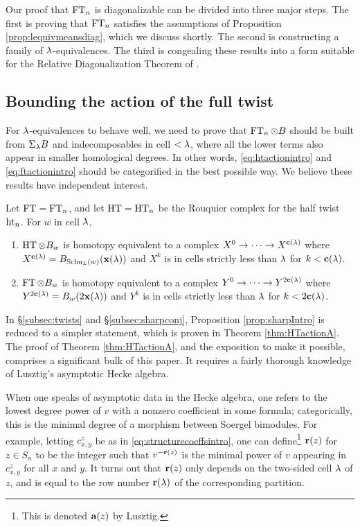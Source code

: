 Our proof that $\operatorname{FT}_n$ is diagonalizable can be divided into three major steps. The first is proving that $\operatorname{FT}_n$ satisfies the assumptions of Proposition \ref{prop:lequivmeansdiag},
which we discuss shortly. The second is constructing a family of $\lambda$-equivalences. The third is congealing these results into a form suitable for the Relative Diagonalization Theorem of
\cite{ElHog17a}.

\subsection{Bounding the action of the full twist}
\label{subsec:boundingintro}

For $\lambda$-equivalences to behave well, we need to prove that $\operatorname{FT}_n \otimes B$ should be built from $\Sigma_\lambda B$ and indecomposables in cell $< \lambda$, where all the lower terms also appear in
smaller homological degrees. In other words, \eqref{eq:htactionintro} and \eqref{eq:ftactionintro} should be categorified in the best possible way. We believe these results have
independent interest.

\begin{prop} \label{prop:sharpIntro} Let $\operatorname{FT} = \operatorname{FT}_n$, and let $\operatorname{HT} = \operatorname{HT}_n$ be the Rouquier complex for the half twist $\operatorname{ht}_n$. For $w$ in cell $\lambda$,
\begin{enumerate}
\item $\operatorname{HT}\otimes B_w$ is homotopy equivalent to a complex $X^0\rightarrow \cdots \rightarrow X^{\mathbf{c}(\lambda)}$ where $X^{\mathbf{c}(\lambda)}=B_{\operatorname{Schu}_L(w)}(\mathbf{x}(\lambda))$ and $X^k$ is in cells strictly less than $\lambda$ for $k<\mathbf{c}(\lambda)$.
\item $\operatorname{FT}\otimes B_w$ is homotopy equivalent to a complex $Y^0\rightarrow \cdots \rightarrow Y^{2\mathbf{c}(\lambda)}$ where $Y^{2\mathbf{c}(\lambda)}=B_{w}(2\mathbf{x}(\lambda))$ and $Y^k$ is in cells strictly less than $\lambda$ for $k<2\mathbf{c}(\lambda)$.
\end{enumerate} \end{prop}

In \S\ref{subsec:twists} and \S\ref{subsec:sharpconj}, Proposition \ref{prop:sharpIntro} is reduced to a simpler statement, which is proven in Theorem \ref{thm:HTactionA}. The proof of Theorem \ref{thm:HTactionA}, and the exposition to make it possible, comprises a significant bulk of this paper. It requires a fairly thorough knowledge of Lusztig's
asymptotic Hecke algebra.

When one speaks of asymptotic data in the Hecke algebra, one refers to the lowest degree power of $v$ with a nonzero coefficient in some formula; categorically,
this is the minimal degree of a morphism between Soergel bimodules. For example, letting $c_{x,y}^z$ be as in \eqref{eq:structurecoeffsintro}, one can define\footnote{This is denoted
$\mathbf{a}(z)$ by Lusztig.} $\mathbf{r}(z)$ for $z \in S_n$ to be the integer such that $v^{-\mathbf{r}(z)}$ is the minimal power of $v$ appearing in $c_{x,y}^z$ for all $x$ and $y$. It turns out that
$\mathbf{r}(z)$ only depends on the two-sided cell $\lambda$ of $z$, and is equal to the row number $\mathbf{r}(\lambda)$ of the corresponding partition.

